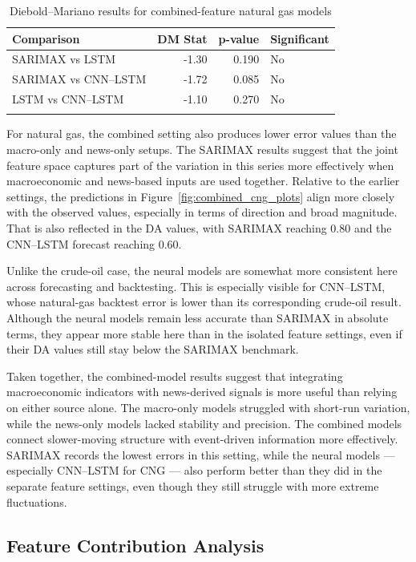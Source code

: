\documentclass[pdflatex,sn-mathphys-num]{sn-jnl}%
\theoremstyle{thmstyleone}%
\theoremstyle{thmstyletwo}%
\theoremstyle{thmstylethree}%
\begin{document}
\begin{table}[h]
\centering
\small
\caption{Diebold--Mariano results for combined-feature natural gas models}
\label{tab:dm_combined_cng}
\begin{tabular}{@{}lrrl@{}}
\toprule
Comparison & DM Stat & p-value & Significant \\
\midrule
SARIMAX vs LSTM & -1.30 & 0.190 & No \\
SARIMAX vs CNN--LSTM & -1.72 & 0.085 & No \\
LSTM vs CNN--LSTM & -1.10 & 0.270 & No \\
\botrule
\end{tabular}
\end{table}

For natural gas, the combined setting also produces lower error values than the macro-only and news-only setups. The SARIMAX results suggest that the joint feature space captures part of the variation in this series more effectively when macroeconomic and news-based inputs are used together. Relative to the earlier settings, the predictions in Figure~\ref{fig:combined_cng_plots} align more closely with the observed values, especially in terms of direction and broad magnitude. That is also reflected in the DA values, with SARIMAX reaching 0.80 and the CNN--LSTM forecast reaching 0.60.

Unlike the crude-oil case, the neural models are somewhat more consistent here across forecasting and backtesting. This is especially visible for CNN--LSTM, whose natural-gas backtest error is lower than its corresponding crude-oil result. Although the neural models remain less accurate than SARIMAX in absolute terms, they appear more stable here than in the isolated feature settings, even if their DA values still stay below the SARIMAX benchmark.

Taken together, the combined-model results suggest that integrating macroeconomic indicators with news-derived signals is more useful than relying on either source alone. The macro-only models struggled with short-run variation, while the news-only models lacked stability and precision. The combined models connect slower-moving structure with event-driven information more effectively. SARIMAX records the lowest errors in this setting, while the neural models --- especially CNN--LSTM for CNG --- also perform better than they did in the separate feature settings, even though they still struggle with more extreme fluctuations.

\subsection{Feature Contribution Analysis}\label{subsec:feature_contribution}
\end{document}
